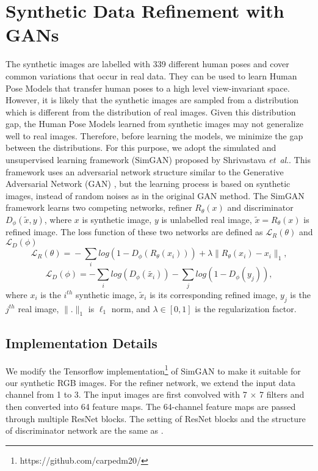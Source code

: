 \documentclass[twocolumn]{svjour3}          \smartqed  \usepackage{graphicx}
\newcommand{\etal}{\textit{et~al}.}
\begin{document}
\section{Synthetic Data Refinement with GANs}
\label{sec:GAN}

The synthetic images are labelled with 339 different human poses and cover common variations that occur in real data. They can be used to learn Human Pose Models that transfer human poses to a high level view-invariant space. However, it is likely that the synthetic images are sampled from a distribution which is different from the distribution of real images. Given this distribution gap, the Human Pose Models learned from synthetic images may not generalize well to real images. Therefore, before learning the models, we minimize the gap between the distributions. For this purpose, we adopt the simulated and unsupervised learning framework (SimGAN) \citep{shrivastava2016learning} proposed by Shrivastava \etal. This framework uses an adversarial network structure similar to the Generative Adversarial Network (GAN) \citep{goodfellow2014generative}, but the learning process is based on synthetic images, instead of random noises as in the original GAN method. The SimGAN framework learns two competing networks, refiner $R_\theta(x)$ and discriminator $D_\phi(\tilde{x},y)$, where $x$ is synthetic image, $y$ is unlabelled real image, $\tilde{x}=R_\theta(x)$ is refined image. The loss function of these two networks are defined as $\mathcal{L}_R(\theta)$ and $\mathcal{L}_D(\phi)$ \citep{shrivastava2016learning}
\begin{equation} 
    \mathcal{L}_R(\theta)\!\! = \! -\!\!\sum_{i}log(1-D_\phi(R_\theta(x_i))) + \lambda\|R_\theta(x_i)-x_i\|_1,
 \end{equation}
 \vspace{-5mm}
 \begin{equation} 
    \mathcal{L}_D(\phi) = -\sum_{i}log(D_\phi(\tilde{x_i})) - \sum_{j}log(1-D_\phi(y_j)),
\end{equation}
where $x_i$ is the $i^{th}$ synthetic image, $\tilde{x}_i$ is its corresponding refined image, $y_j$ is the $j^{th}$ real image, $\|.\|_1$ is $\ell_1$ norm, and $\lambda\in[0,1]$ is the regularization factor.

\subsection{Implementation Details}

We modify the Tensorflow implementation\footnote{https://github.com/carpedm20/} of SimGAN to make it suitable for our synthetic RGB images. For the refiner network, we extend the input data channel from 1 to 3. The input images are first convolved with 7 $\times$ 7 filters and then converted into 64 feature maps. The 64-channel feature maps are passed through multiple ResNet blocks. The setting of ResNet blocks and the structure of discriminator network are the same as \citep{shrivastava2016learning}.
\end{document}
